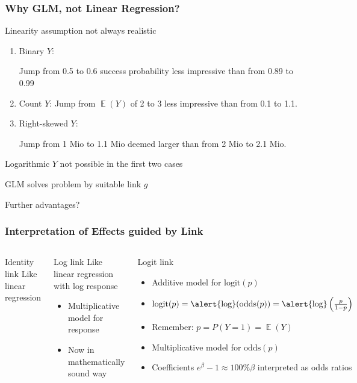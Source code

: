\documentclass[
    utf8,
    aspectratio=169
]{beamer}  %
\DeclareMathOperator{\E}{\mathbb{E}}  %
\begin{document}
\begin{frame}
	\frametitle{Why GLM, not Linear Regression?}
	\begin{block}{Linearity assumption not always realistic}
		\begin{enumerate}
			\item Binary $Y$: 
			
			Jump from 0.5 to 0.6 success probability less impressive than from 0.89 to 0.99
			\item Count $Y$: Jump from $\E(Y)$ of 2 to 3 less impressive than from 0.1 to 1.1.
			\item Right-skewed $Y$: 
			
			Jump from 1 Mio to 1.1 Mio deemed larger than from 2 Mio to 2.1 Mio.
		\end{enumerate}
	\alert{Logarithmic $Y$ not possible in the first two cases}
	\end{block}

	\vfill
	
	\begin{block}{GLM solves problem by suitable link $g$}
	\end{block}
	
	\vfill
	
	\begin{block}{Further advantages?}
	\end{block}
\end{frame}

\begin{frame}
	\frametitle{Interpretation of Effects guided by Link}
	\begin{columns}[onlytextwidth]
		\begin{block}{Identity link}
			Like linear regression
		\end{block}
		
		\begin{block}{Log link}
			Like linear regression with log response
			\begin{itemize}
				\item Multiplicative model for response
				\item Now in mathematically sound way
			\end{itemize}
		\end{block}
		
		\begin{block}{Logit link}
			\begin{itemize}
				\item Additive model for $\text{logit}(p)$
				\item $\text{logit}(p) = \text{\alert{log}}(\text{odds}(p)) = \text{\alert{log}}\left(\frac{p}{1-p}\right)$
				\item Remember: $p = P(Y=1) = \E(Y)$				
				\item Multiplicative model for $\text{odds}(p)$
				\item Coefficients \alert{$e^\beta - 1 \approx 100\%\beta$} interpreted as odds ratios
			\end{itemize}
		\end{block}
	\end{columns}
\end{frame}
\end{document}

